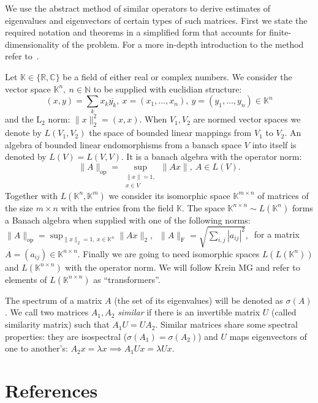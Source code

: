 \documentclass[a4paper]{jpconf}
\begin{document}
We use the abstract method of similar operators
    to derive estimates of eigenvalues and eigenvectors
    of certain types of such matrices.
First we state the required notation and theorems
    in a simplified form that accounts for finite-dimensionality
    of the problem.
For a more in-depth introduction to the method
    refer to~\cite{baskakov1983methods,baskakov2014memory,baskakov2017method,baskakov2013completeness}.

Let \( \mathbb{K}\in \{ \mathbb{R}, \mathbb{C} \} \)
    be a field of either real or complex numbers.
We consider the vector space \( \mathbb{K}^n,\ n\in \mathbb{N} \)
    to be supplied with euclidian structure:
    \[
        (x, y){=}\sum_k x_k\overline{y_k},
        \ x{=}(x_1,\ldots, x_n),
        \ y=(y_1,\ldots, y_n)
        \in \mathbb{K}^n
        \]
    and the \( \mathrm{L}_2 \) norm:
    \(
        \|x\|_2^2{=}(x,x).
        \)
When \( V_1, V_2 \) are normed vector spaces
    we denote by \( L(V_1, V_2) \)
    the space of bounded linear mappings
    from \( V_1 \) to \( V_2 \).
An algebra of bounded linear endomorphisms
    from a banach space \( V \)
    into itself
    is denoted by \( L(V) = L(V, V) \).
It is a banach algebra with the operator norm:
    \[
        \|A\|_{\mathrm{op}} =
        \sup_{\substack{\|x\|=1,\\ x\in V}} \|A x\|,\ A\in L(V).
        \]
Together with \( L(\mathbb{K}^n, \mathbb{K}^m) \)
    we consider its isomorphic space \( \mathbb{K}^{m{\times}n} \)
    of matrices of the size \( m{\times}n \)
    with the entries from the field \( \mathbb{K} \).
The space \( \mathbb{K}^{n{\times}n}\sim L(\mathbb{K}^n) \)
    forms a Banach algebra
    when supplied with one of the following norms:
    \( \|A\|_{\mathrm{op}} = \sup_{\|x\|_2=1,\ x\in \mathbb{K}^n} \|A x\|_2,\ \)
    \( \|A\|_{\mathrm{F}} = \sqrt{\sum_{i,j} |a_{ij}|^2},\ \)
    for a matrix 
    \( A{=}(a_{ij})\in\mathbb{K}^{n\times n} \).
Finally we are going to need isomorphic spaces
    \( L(L(\mathbb{K}^n)) \) and \( L(\mathbb{K}^{n{\times}n}) \)
    with the operator norm.
We will follow {Krein MG}
    and refer to elements of \( L(\mathbb{K}^{n{\times}n}) \)
    as ``transformers''.

The spectrum of a matrix \( A \)
    (the set of its eigenvalues)
    will be denoted as \( \sigma(A) \).
We call two matrices \( A_1, A_2 \) \emph{similar}
    if there is an invertible matrix \( U \)
    (called similarity matrix)
    such that \( A_1 U = U A_2 \).
Similar matrices share some spectral properties:
    they are isospectral (\( \sigma(A_1) = \sigma(A_2) \))
    and \( U \) maps eigenvectors of one to another's:
    \( A_2 x = \lambda x \implies A_1 U x = \lambda U x \).
\section*{References}

{}
\end{document}
